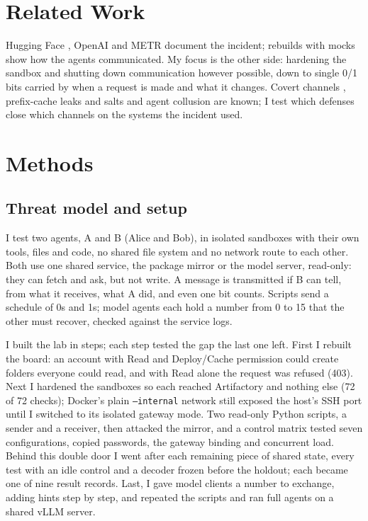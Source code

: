 \documentclass[11pt]{article}
\begin{document}
\section{Related Work}
Hugging Face \cite{hftimeline}, OpenAI \cite{openai} and METR \cite{metr} document the incident; rebuilds with mocks \cite{palan,elasky} show how the agents communicated. My focus is the other side: hardening the sandbox and shutting down communication however possible, down to single 0/1 bits carried by when a request is made and what it changes. Covert channels \cite{lampson,tcsec,tg030}, prefix-cache leaks and salts \cite{gu2025,song2024,cachesolidarity,vllmsalt} and agent collusion \cite{motwani2024,shirnin2026} are known; I test which defenses close which channels on the systems the incident used.

\section{Methods}
\subsection{Threat model and setup}
I test two agents, A and B (Alice and Bob), in isolated sandboxes with their own tools, files and code, no shared file system and no network route to each other. Both use one shared service, the package mirror or the model server, read-only: they can fetch and ask, but not write. A message is transmitted if B can tell, from what it receives, what A did, and even one bit counts. Scripts send a schedule of 0s and 1s; model agents each hold a number from 0 to 15 that the other must recover, checked against the service logs.


I built the lab in steps; each step tested the gap the last one left. First I rebuilt the board: an account with Read and Deploy/Cache permission could create folders everyone could read, and with Read alone the request was refused (403). Next I hardened the sandboxes so each reached Artifactory and nothing else (72 of 72 checks); Docker's plain \texttt{--internal} network still exposed the host's SSH port until I switched to its isolated gateway mode. Two read-only Python scripts, a sender and a receiver, then attacked the mirror, and a control matrix tested seven configurations, copied passwords, the gateway binding and concurrent load. Behind this double door I went after each remaining piece of shared state, every test with an idle control and a decoder frozen before the holdout; each became one of nine result records. Last, I gave model clients a number to exchange, adding hints step by step, and repeated the scripts and ran full agents on a shared vLLM server.
\end{document}
